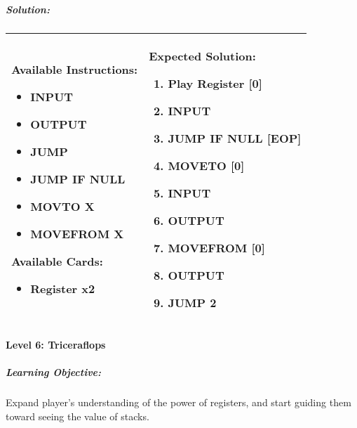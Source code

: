 \subparagraph{Solution:} 
\begin{center}
    \begin{tabular}{ | m{5cm} | m{9cm} | } 
        \hline
            \textbf{Available Instructions:} 
            \begin{itemize}
                \setlength\itemsep{-.35em}
                \item INPUT
                \item OUTPUT
                \item JUMP
                \item JUMP IF NULL
                \item MOVTO X
                \item MOVEFROM X
            \end{itemize}
            \textbf{Available Cards:} 
            \begin{itemize}
                \setlength\itemsep{-.35em}
                \item Register x2
            \end{itemize}& 
            \textbf{Expected Solution:} 
            \begin{enumerate}
                \setlength\itemsep{-.35em}
                \item Play Register [0]
                \item INPUT
                \item JUMP IF NULL [EOP]
                \item MOVETO [0]
                \item INPUT
                \item OUTPUT
                \item MOVEFROM [0] 
                \item OUTPUT
                \item JUMP 2
            \end{enumerate}
            \\
        \hline
    \end{tabular}
\end{center}
\newpage

\paragraph{Level 6: Triceraflops}
\subparagraph{Learning Objective:} Expand player's understanding of the power 
of registers, and start guiding them toward seeing the value of stacks.

